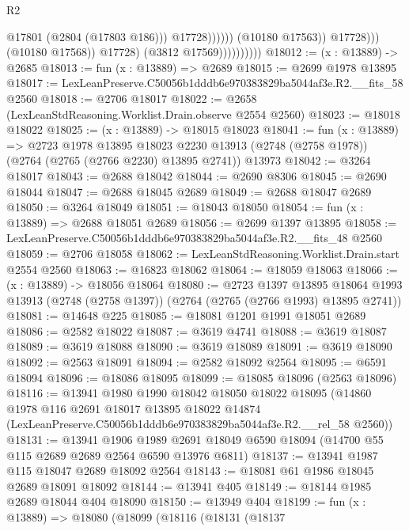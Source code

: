 \begin{lexlean}{R2}
\begin{coremodule}
                                                @17801
                                                (@2804 (@17803 @186)))
                                              @17728))))))
                                  (@10180 @17563))
                                @17728)))
                          (@10180 @17568))
                        @17728)
                      (@3812 @17569))))))))))
@18012 := (x : @13889) -> @2685
@18013 := fun (x : @13889) => @2689
@18015 := @2699 @1978 @13895
@18017 := LexLeanPreserve.C50056b1dddb6e970383829ba5044af3e.R2.__fits_58 @2560
@18018 := @2706 @18017
@18022 := @2658 (LexLeanStdReasoning.Worklist.Drain.observe @2554 @2560)
@18023 := @18018 @18022
@18025 := (x : @13889) -> @18015 @18023
@18041 := fun (x : @13889) =>
  @2723
    @1978
    @13895
    @18023
    @2230
    @13913
    (@2748 (@2758 @1978))
    (@2764 (@2765 (@2766 @2230) @13895 @2741))
    @13973
@18042 := @3264 @18017
@18043 := @2688 @18042
@18044 := @2690 @8306
@18045 := @2690 @18044
@18047 := @2688 @18045 @2689
@18049 := @2688 @18047 @2689
@18050 := @3264 @18049
@18051 := @18043 @18050
@18054 := fun (x : @13889) => @2688 @18051 @2689
@18056 := @2699 @1397 @13895
@18058 := LexLeanPreserve.C50056b1dddb6e970383829ba5044af3e.R2.__fits_48 @2560
@18059 := @2706 @18058
@18062 := LexLeanStdReasoning.Worklist.Drain.start @2554 @2560
@18063 := @16823 @18062
@18064 := @18059 @18063
@18066 := (x : @13889) -> @18056 @18064
@18080 := @2723
    @1397
    @13895
    @18064
    @1993
    @13913
    (@2748 (@2758 @1397))
    (@2764 (@2765 (@2766 @1993) @13895 @2741))
@18081 := @14648 @225
@18085 := @18081 @1201 @1991 @18051 @2689
@18086 := @2582 @18022
@18087 := @3619 @4741
@18088 := @3619 @18087
@18089 := @3619 @18088
@18090 := @3619 @18089
@18091 := @3619 @18090
@18092 := @2563 @18091
@18094 := @2582 @18092 @2564
@18095 := @6591 @18094
@18096 := @18086 @18095
@18099 := @18085 @18096 (@2563 @18096)
@18116 := @13941
    @1980
    @1990
    @18042
    @18050
    @18022
    @18095
    (@14860
      @1978
      @116
      @2691
      @18017
      @13895
      @18022
      @14874
      (LexLeanPreserve.C50056b1dddb6e970383829ba5044af3e.R2.__rel_58 @2560))
@18131 := @13941
    @1906
    @1989
    @2691
    @18049
    @6590
    @18094
    (@14700 @55 @115 @2689 @2689 @2564 @6590 @13976 @6811)
@18137 := @13941 @1987 @115 @18047 @2689 @18092 @2564
@18143 := @18081 @61 @1986 @18045 @2689 @18091 @18092
@18144 := @13941 @405
@18149 := @18144 @1985 @2689 @18044 @404 @18090
@18150 := @13949 @404
@18199 := fun (x : @13889) =>
  @18080
    (@18099
      (@18116
        (@18131
          (@18137

\end{coremodule}
\end{lexlean}
